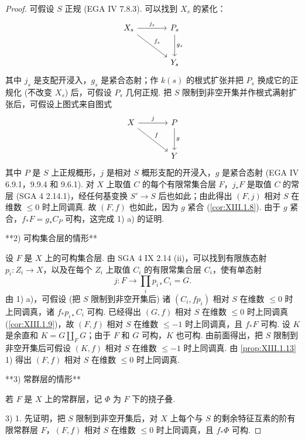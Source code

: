 \begin{proof}
可假设 $S$ 正规 (EGA IV 7.8.3). 可以找到 $X_s$ 的紧化：
\[
\begin{tikzcd}[row sep=large, column sep=large]
X_s \arrow[r,"{j_s}"] \arrow[dr,"{f_s}"] & P_s \arrow[d,"{g_s}"] \\
& Y_s
\end{tikzcd}
\]
其中 $j_s$ 是支配开浸入，$g_s$ 是紧合态射；作 $k(s)$ 的根式扩张并把 $P_s$ 换成它的正规化 (不改变 $X_s$) 后，可假设 $P_s$ 几何正规. 把 $S$ 限制到非空开集并作根式满射扩张后，可假设上图式来自图式
\[
\begin{tikzcd}[row sep=large, column sep=large]
X \arrow[r,"{j}"] \arrow[dr,"{f}"] & P \arrow[d,"{g}"] \\
& Y
\end{tikzcd}
\]
其中 $P$ 是 $S$ 上正规概形，$j$ 是相对 $S$ 概形支配的开浸入，$g$ 是紧合态射 (EGA IV 6.9.1，9.9.4 和 9.6.1). 对 $X$ 上取值 $C$ 的每个有限常集合层 $F$，$j_* F$ 是取值 $C$ 的常层 (SGA 4 2.14.1)，经任何基变换 $S' \to S$ 后也如此；由此得出 $(F, j)$ 相对 $S$ 在维数 $\leqslant 0$ 时上同调真. 故 $(F, f)$ 也如此，因为 $g$ 紧合 (\cref{cor:XIII.1.8}). 由于 $g$ 紧合，$f_* F = g_* C_P$ 可构，这完成 1) a) 的证明.

**2) 可构集合层的情形**

设 $F$ 是 $X$ 上的可构集合层. 由 SGA 4 IX 2.14 (ii)，可以找到有限族态射 $p_i \colon Z_i \to X$，以及在每个 $Z_i$ 上取值 $C_i$ 的有限常集合层 $C_i$，使有单态射
\[
j \colon F \longrightarrow \prod_i p_{i*} C_i = G.
\]
由 1) a)，可假设 (把 $S$ 限制到非空开集后) 诸 $(C_i, fp_i)$ 相对 $S$ 在维数 $\leqslant 0$ 时上同调真，诸 $f_* p_{i*} C_i$ 可构. 已经得出 $(G, f)$ 相对 $S$ 在维数 $\leqslant 0$ 时上同调真 (\cref{cor:XIII.1.9})，故 $(F, f)$ 相对 $S$ 在维数 $\leqslant -1$ 时上同调真，且 $f_* F$ 可构. 设 $K$ 是余直和 $K = G \amalg_F G$；由于 $F$ 和 $G$ 可构，$K$ 也可构. 由前面得出，把 $S$ 限制到非空开集后可假设 $(K, f)$ 相对 $S$ 在维数 $\leqslant -1$ 时上同调真. 由 \ref{prop:XIII.1.13} 1) 得出 $(F, f)$ 相对 $S$ 在维数 $\leqslant 0$ 时上同调真.

**3) 常群层的情形**

若 $F$ 是 $X$ 上的常群层，记 $\Phi$ 为 $F$ 下的挠子叠.

3) 1. 先证明，把 $S$ 限制到非空开集后，对 $X$ 上每个与 $S$ 的剩余特征互素的阶有限常群层 $F$，$(F, f)$ 相对 $S$ 在维数 $\leqslant 0$ 时上同调真，且 $f_* \Phi$ 可构.


\end{proof}
